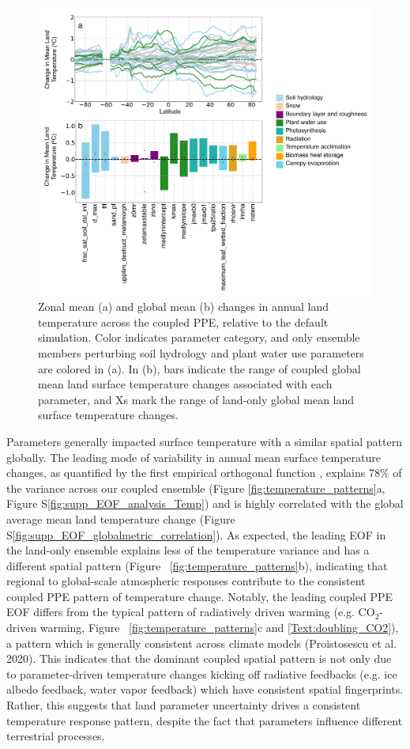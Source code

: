 \documentclass[draft]{agujournal2019}
\begin{document}
\begin{figure}
\noindent\includegraphics[width=\textwidth]{figs/Figure1.pdf}
\caption{Zonal mean (a) and global mean (b) changes in annual land temperature across the coupled PPE, relative to the default simulation. Color indicates parameter category, and only ensemble members perturbing soil hydrology and plant water use parameters are colored in (a). In (b), bars indicate the range of coupled global mean land surface temperature changes associated with each parameter, and Xs mark the range of land-only global mean land surface temperature changes.}
\label{fig:temperature_changes}
\end{figure}

Parameters generally impacted surface temperature with a similar spatial pattern globally. The leading mode of variability in annual mean surface temperature changes, as quantified by the first empirical orthogonal function \citep[EOF; ][]{lorenz_empirical_1956}, explains 78$\%$ of the variance across our coupled ensemble (Figure \ref{fig:temperature_patterns}a, Figure S\ref{fig:supp_EOF_analysis_Temp}) and is highly correlated with the global average mean land temperature change (Figure S\ref{fig:supp_EOF_globalmetric_correlation}). As expected, the leading EOF in the land-only ensemble explains less of the temperature variance and has a different spatial pattern (Figure ~\ref{fig:temperature_patterns}b), indicating that regional to global-scale atmospheric responses contribute to the consistent coupled PPE pattern of temperature change. Notably, the leading coupled PPE EOF differs from the typical pattern of radiatively driven warming (e.g. CO$_2$-driven warming, Figure ~\ref{fig:temperature_patterns}c and \ref{Text:doubling_CO2}), a pattern which is generally consistent across climate models (Proistosescu et al. 2020). This indicates that the dominant coupled spatial pattern is not only due to parameter-driven temperature changes kicking off radiative feedbacks (e.g. ice albedo feedback, water vapor feedback) which have consistent spatial fingerprints. Rather, this suggests that land parameter uncertainty drives a consistent temperature response pattern, despite the fact that parameters influence different terrestrial processes.
\end{document}
